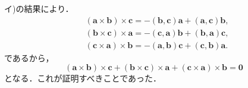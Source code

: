 \begin{tproof}
  イ)の結果により．
  \begin{align*}
     & (\bm{a}\times\bm{b}) \times \bm{c} =  -(\bm{b},\bm{c})\bm{a}+(\bm{a},\bm{c}) \bm{b} ,    \\
     & (\bm{b} \times \bm{c} ) \times \bm{a} = -(\bm{c},\bm{a}) \bm{b} +(\bm{b},\bm{a}) \bm{c}, \\
     & (\bm{c} \times \bm{a} ) \times \bm{b} = -(\bm{a},\bm{b}) \bm{c} +(\bm{c},\bm{b}) \bm{a}.
  \end{align*}
  であるから，
  \[
    (\bm{a}\times\bm{b}) \times \bm{c} + (\bm{b} \times \bm{c} ) \times \bm{a}+(\bm{c} \times \bm{a} ) \times \bm{b} =\bm{0}
  \]
  となる．これが証明すべきことであった．
\end{tproof}